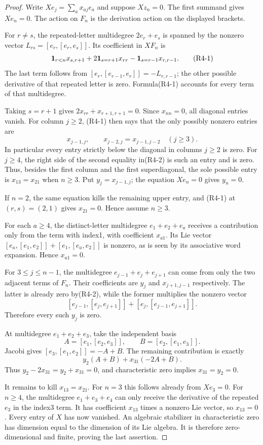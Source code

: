 \begin{proof}
Write $X e_j=\sum_a x_{aj}e_a$ and suppose $Xz_n=0$.
The first summand gives $Xe_n=0$.  The action on $F_n$ is
the derivation action on the displayed brackets.

For $r\ne s$, the repeated-letter multidegree
$2e_r+e_s$ is spanned by the nonzero vector
$L_{rs}=[e_r,[e_r,e_s]]$.  Its coefficient in $XF_n$ is
\[
 {\bf1}_{r<n}x_{s,r+1}
       +2{\bf1}_{s=r+1}x_{rr}
       -{\bf1}_{s=r-1}x_{r,r-1}.                 \tag{R4-1}
\]
The last term follows from
$[e_r,[e_{r-1},e_r]]=-L_{r,r-1}$; the other possible
derivative of that repeated letter is zero.  Formula(R4-1)
accounts for every term of that multidegree.

Taking $s=r+1$ gives
$2x_{rr}+x_{r+1,r+1}=0$.  Since $x_{nn}=0$, all diagonal
entries vanish.  For column $j\ge2$, (R4-1) then says that
the only possibly nonzero entries are
\[
 x_{j-1,j},\qquad
 x_{j-2,j}=x_{j-1,j-2}\quad(j\ge3).
                                                        \tag{R4-2}
\]
In particular every entry strictly below the diagonal in
columns $j\ge2$ is zero.  For $j\ge4$, the right side of
the second equality in(R4-2) is such an entry and is zero.
Thus, besides the first column and the first superdiagonal,
the sole possible entry is $x_{13}=x_{21}$ when $n\ge3$.
Put $y_j=x_{j-1,j}$; the equation $Xe_n=0$ gives $y_n=0$.

If $n=2$, the same equation kills the remaining upper entry,
and (R4-1) at $(r,s)=(2,1)$ gives $x_{21}=0$.  Hence assume
$n\ge3$.

For each $a\ge4$, the distinct-letter multidegree
$e_1+e_2+e_a$ receives a contribution only from the term
with index1, with coefficient $x_{a1}$.  Its Lie vector
$[e_a,[e_1,e_2]]+[e_1,[e_a,e_2]]$ is nonzero, as is seen
by its associative word expansion.  Hence $x_{a1}=0$.

For $3\le j\le n-1$, the multidegree
$e_{j-1}+e_j+e_{j+1}$ can come from only the two adjacent
terms of $F_n$.  Their coefficients are $y_j$ and
$x_{j+1,j-1}$ respectively.  The latter is already zero
by(R4-2), while the former multiplies the nonzero vector
\[
 [e_{j-1},[e_j,e_{j+1}]]+
 [e_j,[e_{j-1},e_{j+1}]].
\]
Therefore every such $y_j$ is zero.

At multidegree $e_1+e_2+e_3$, take the independent basis
\[
 A=[e_1,[e_2,e_3]],\qquad
 B=[e_2,[e_1,e_3]].
\]
Jacobi gives $[e_3,[e_1,e_2]]=-A+B$.
The remaining contribution is exactly
\[
                       y_2(A+B)+x_{31}(-2A+B).
\]
Thus $y_2-2x_{31}=y_2+x_{31}=0$, and characteristic zero
implies $x_{31}=y_2=0$.

It remains to kill $x_{13}=x_{21}$.  For $n=3$ this follows
already from $Xe_3=0$.  For $n\ge4$, the multidegree
$e_1+e_3+e_4$ can only receive the derivative of the
repeated $e_3$ in the index3 term.  It has coefficient
$x_{13}$ times a nonzero Lie vector, so $x_{13}=0$.
Every entry of $X$ has now vanished.  An algebraic
stabilizer in characteristic zero has dimension equal to
the dimension of its Lie algebra.  It is therefore
zero-dimensional and finite, proving the last assertion.
\end{proof}


